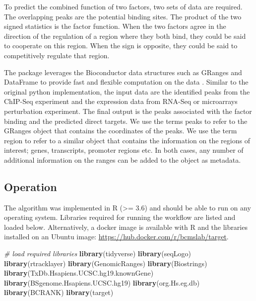 \documentclass[9pt,a4paper,]{extarticle}
\newenvironment{Shaded}{\begin{snugshade}}{\end{snugshade}}
\newcommand{\CommentTok}[1]{\textcolor[rgb]{0.56,0.35,0.01}{\textit{#1}}}
\newcommand{\KeywordTok}[1]{\textcolor[rgb]{0.13,0.29,0.53}{\textbf{#1}}}
\newcommand{\NormalTok}[1]{#1}
\begin{document}
To predict the combined function of two factors, two sets of data are required. The overlapping peaks are the potential binding sites. The product of the two signed statistics is the factor function. When the two factors agree in the direction of the regulation of a region where they both bind, they could be said to cooperate on this region. When the sign is opposite, they could be said to competitively regulate that region.

The package leverages the Bioconductor data structures such as GRanges and DataFrame to provide fast and flexible computation on the data \citet{Huber2015}. Similar to the original python implementation, the input data are the identified peaks from the ChIP-Seq experiment and the expression data from RNA-Seq or microarrays perturbation experiment. The final output is the peaks associated with the factor binding and the predicted direct targets. We use the terms peaks to refer to the GRanges object that contains the coordinates of the peaks. We use the term region to refer to a similar object that contains the information on the regions of interest; genes, transcripts, promoter regions etc. In both cases, any number of additional information on the ranges can be added to the object as metadata.

\hypertarget{operation}{%
\subsection{Operation}\label{operation}}

The algorithm was implemented in R (\textgreater{}= 3.6) and should be able to run on any operating system. Libraries required for running the workflow are listed and loaded below. Alternatively, a docker image is available with R and the libraries installed on an Ubuntu image: \url{https://hub.docker.com/r/bcmslab/target}.

\begin{Shaded}
\begin{Highlighting}[]
\CommentTok{# load required libraries}
\KeywordTok{library}\NormalTok{(tidyverse)}
\KeywordTok{library}\NormalTok{(seqLogo)}
\KeywordTok{library}\NormalTok{(rtracklayer)}
\KeywordTok{library}\NormalTok{(GenomicRanges)}
\KeywordTok{library}\NormalTok{(Biostrings)}
\KeywordTok{library}\NormalTok{(TxDb.Hsapiens.UCSC.hg19.knownGene)}
\KeywordTok{library}\NormalTok{(BSgenome.Hsapiens.UCSC.hg19)}
\KeywordTok{library}\NormalTok{(org.Hs.eg.db)}
\KeywordTok{library}\NormalTok{(BCRANK)}
\KeywordTok{library}\NormalTok{(target)}
\end{Highlighting}
\end{Shaded}
\end{document}
